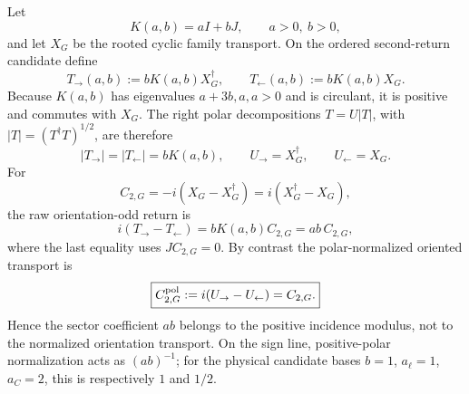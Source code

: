 \documentclass[11pt,a4paper]{article}
\begin{document}
\begin{theorem}
\label{p6:thm:v564-polar-separated-oriented-return}
Let
\[
 K(a,b)=aI+bJ,\qquad a>0,\ b>0,
\]
and let \(X_G\) be the rooted cyclic family transport.  On the ordered
second-return candidate define
\begin{equation}
\label{p6:eq:v564-ordered-return-pair}
 T_{\rightarrow}(a,b):=bK(a,b)X_G^\dagger,
 \qquad
 T_{\leftarrow}(a,b):=bK(a,b)X_G.
\end{equation}
Because \(K(a,b)\) has eigenvalues \(a+3b,a,a>0\) and is circulant, it is
positive and commutes with \(X_G\).  The
right polar decompositions \(T=U|T|\), with
\(|T|=(T^\dagger T)^{1/2}\), are therefore
\begin{equation}
\label{p6:eq:v564-polar-factors}
 |T_{\rightarrow}|=|T_{\leftarrow}|=bK(a,b),
 \qquad
 U_{\rightarrow}=X_G^\dagger,
 \qquad
 U_{\leftarrow}=X_G.
\end{equation}
For
\[
 C_{2,G}=-i(X_G-X_G^\dagger)=i(X_G^\dagger-X_G),
\]
the raw orientation-odd return is
\begin{equation}
\label{p6:eq:v564-raw-oriented-return}
 i(T_{\rightarrow}-T_{\leftarrow})
 =bK(a,b)C_{2,G}
 =ab\,C_{2,G},
\end{equation}
where the last equality uses \(JC_{2,G}=0\).  By contrast the
polar-normalized oriented transport is
\begin{equation}
\label{p6:eq:v564-polar-oriented-return}
 \boxed{
 C_{2,G}^{\rm pol}:=i(U_{\rightarrow}-U_{\leftarrow})=C_{2,G}.}
\end{equation}
Hence the sector coefficient \(ab\) belongs to the positive incidence
modulus, not to the normalized orientation transport.  On the sign line,
positive-polar normalization acts as \((ab)^{-1}\); for the physical
candidate bases \(b=1\), \(a_\ell=1\), \(a_C=2\), this is respectively
\(1\) and \(1/2\).
\end{theorem}
\end{document}

